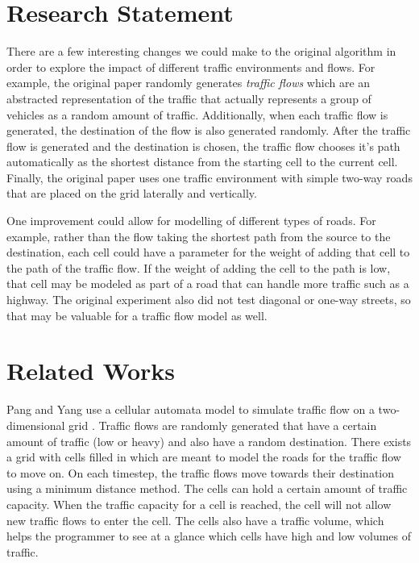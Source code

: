 \documentclass[sigplan,screen]{acmart}
\begin{document}

\maketitle

\section{Research Statement}
There are a few interesting changes we could make to the original algorithm in
order to explore the impact of different traffic environments and flows. For
example, the original paper randomly generates \textit{traffic flows} which are
an abstracted representation of the traffic that actually represents a group of
vehicles as a random amount of traffic. Additionally, when each traffic flow is
generated, the destination of the flow is also generated randomly. After the
traffic flow is generated and the destination is chosen, the traffic flow
chooses it's path automatically as the shortest distance from the starting cell
to the current cell. Finally, the original paper uses one traffic environment
with simple two-way roads that are placed on the grid laterally and vertically.

One improvement could allow for modelling of different types of roads. For
example, rather than the flow taking the shortest path from the source to the
destination, each cell could have a parameter for the weight of adding that cell
to the path of the traffic flow. If the weight of adding the cell to the path is
low, that cell may be modeled as part of a road that can handle more traffic
such as a highway. The original experiment also did not test diagonal or one-way
streets, so that may be valuable for a traffic flow model as well.

\section{Related Works}
Pang and Yang use a cellular automata model to simulate traffic flow on a
two-dimensional grid \cite{pang_simulation_2019}. Traffic flows are randomly
generated that have a certain amount of traffic (low or heavy) and also have a
random destination. There exists a grid with cells filled in which are meant to
model the roads for the traffic flow to move on. On each timestep, the traffic
flows move towards their destination using a minimum distance method. The cells
can hold a certain amount of traffic capacity. When the traffic capacity for a
cell is reached, the cell will not allow new traffic flows to enter the cell.
The cells also have a traffic volume, which helps the programmer to see at a
glance which cells have high and low volumes of traffic.
\end{document}
